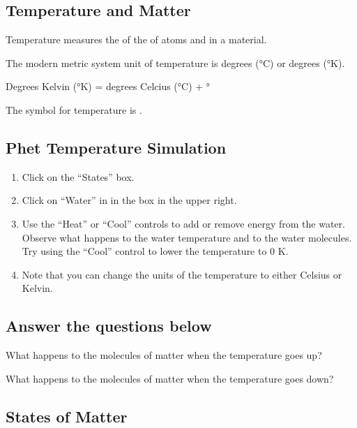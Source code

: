 \documentclass[answers,12pt]{exam}
\begin{document}
\begin{questions}
\pagebreak

\subsection{Temperature and Matter}


\question Temperature measures the \fillin of the \fillin of atoms and \fillin in a material.

\question The modern metric system unit of temperature is degrees \fillin (°C) or degrees \fillin (°K).

\question Degrees Kelvin (°K) = degrees Celcius (°C) + \fillin°

\question The symbol for temperature is \fillin.


\end{questions}

\subsection*{Phet Temperature Simulation}

\begin{enumerate}
  \item Click on the “States” box.
  \item Click on “Water” in in the box in the upper right.
  \item Use the “Heat” or “Cool” controls to add or remove energy from the water. Observe what happens to the water temperature and to the water molecules. Try using the “Cool” control to lower the temperature to 0 K.
  \item Note that you can change the units of the temperature to either Celsius or Kelvin.
\end{enumerate}

\subsection*{Answer the questions below}

\begin{questions}
  \question What happens to the molecules of matter when the temperature goes up?

  \vspace{3cm}

  \question What happens to the molecules of matter when the temperature goes down?
\end{questions}

\pagebreak

\subsection{States of Matter}
\end{document}
